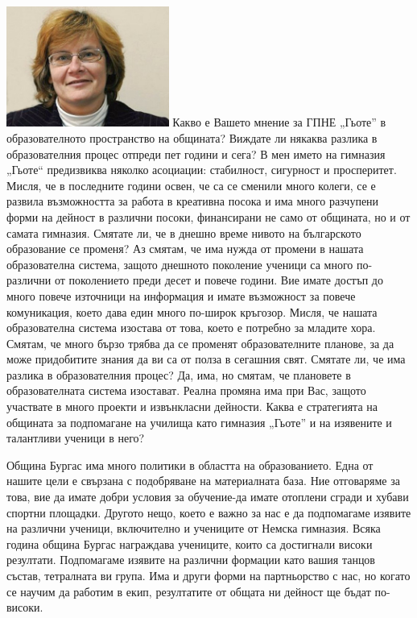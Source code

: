 \begin{multicols}{3}

\noindent \includegraphics[width=2.1in]{./Ananieva/5.jpg}
Какво е Вашето мнение за ГПНЕ „Гьоте” в образователното пространство на 
общината? Виждате ли някаква разлика в образователния процес отпреди пет години 
и сега?
В мен името на гимназия „Гьоте“ предизвиква няколко асоциации: стабилност, 
сигурност и просперитет. Мисля, че в последните години освен, че са се сменили 
много колеги, се е развила възможността за работа в креативна посока и има много 
разчупени форми на дейност в различни посоки, финансирани не само от общината, 
но и от самата гимназия.
Смятате ли, че в днешно време нивото на българското образование се променя?
Аз смятам, че има нужда от  промени в нашата образователна система, защото 
днешното поколение ученици са много по-различни от поколението преди десет и 
повече години. Вие имате достъп до много повече източници на информация и имате 
възможност за повече комуникация, което дава един много по-широк кръгозор. 
Мисля, че нашата образователна система изостава от това, което е потребно за 
младите хора. Смятам, че много бързо трябва да се променят образователните 
планове, за да може придобитите знания да ви са от полза в сегашния свят.
Смятате ли, че има разлика в образователния процес?
Да, има, но смятам, че плановете в образователната система изостават. Реална 
промяна има при Вас, защото участвате в много проекти и извънкласни дейности.
Каква е стратегията на общината за подпомагане на училища като гимназия „Гьоте” 
и на изявените и талантливи ученици в него?

Община Бургас има много политики в областта на образованието. Една от нашите 
цели е свързана с подобряване на материалната база. Ние отговаряме за това, вие 
да имате добри условия за обучение-да имате отоплени сгради и хубави спортни 
площадки. Другото нещо, което е важно за нас е да подпомагаме изявите на 
различни ученици, включително и учениците от Немска гимназия. Всяка година 
община Бургас награждава учениците, които са достигнали високи резултати. 
Подпомагаме изявите на различни формации като вашия танцов състав, тетралната ви 
група. Има и други форми на партньорство с нас, но когато се научим да работим в 
екип, резултатите от общата ни дейност ще бъдат по-високи.


\end{multicols}
